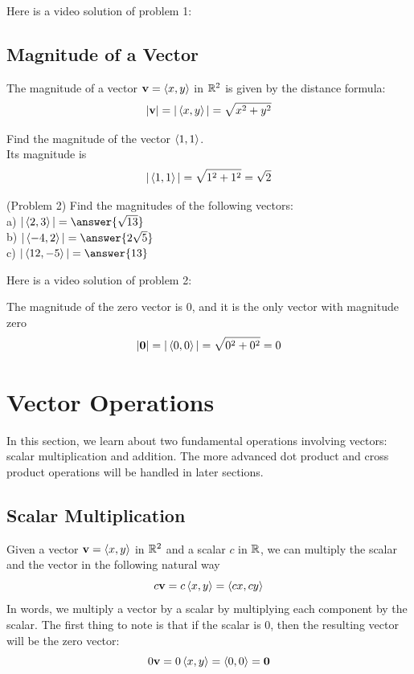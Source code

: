 \documentclass[handout]{ximera}
\begin{document}
Here is a video solution of problem 1:\\
\begin{foldable}
\end{foldable}

\subsection{Magnitude of a Vector}

The magnitude of a vector $\mathbf{v} = \left\langle x,y\right\rangle$ in $\mathbb R^2$ is given by the distance formula:
\[
|\mathbf{v}| = |\left\langle x,y\right\rangle| = \sqrt{x^2 +y^2}
\]

\begin{example}[Example 2]
Find the magnitude of the vector $\left\langle 1,1\right\rangle$.\\
Its magnitude is
\[
|\left\langle 1,1\right\rangle| = \sqrt{1^2 +1^2} = \sqrt 2
\]
\end{example}

\begin{problem}(Problem 2)
Find the magnitudes of the following vectors:\\
a) $|\vector{2,3}| = \answer{\sqrt{13}}$\\
b) $|\vector{-4,2}| = \answer{2\sqrt{5}}$\\
c) $|\vector{12,-5}| = \answer{13}$
\end{problem}

Here is a video solution of problem 2:\\
\begin{foldable}
\end{foldable}

The magnitude of the zero vector is $0$, and it is the only vector with magnitude zero
\[
|\mathbf{0}| = |\left\langle 0,0\right\rangle| = \sqrt{0^2 +0^2} = 0
\]

\section{Vector Operations}
In this section, we learn about two fundamental operations involving vectors: scalar multiplication and addition.
The more advanced dot product and cross product operations will be handled in later sections.

\subsection{Scalar Multiplication}
Given a vector $\mathbf{v} = \left\langle x,y\right\rangle$ in $\mathbb R^2$ and a scalar $c$ in $\mathbb R$, we can multiply the scalar and the vector in the following
natural way
\[
c\mathbf{v} = c\left\langle x,y\right\rangle = \left\langle cx,cy\right\rangle
\]
In words, we multiply a vector by a scalar by multiplying each component by the scalar.
The first thing to note is that if the scalar is 0, then the resulting vector will be the zero vector:
\[
0\mathbf{v} = 0\left\langle x,y\right\rangle = \left\langle 0,0\right\rangle = \mathbf{0}
\]
\end{document}
